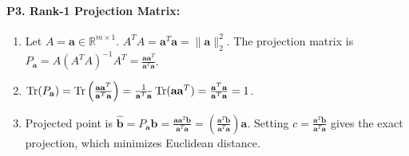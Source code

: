 \paragraph{P3. Rank-1 Projection Matrix:}
\begin{enumerate}[label=(\alph*)]
    \item Let $A = \mathbf{a} \in \mathbb{R}^{m \times 1}$. $A^T A = \mathbf{a}^T \mathbf{a} = \|\mathbf{a}\|_2^2$.
    The projection matrix is $P_{\mathbf{a}} = A(A^T A)^{-1}A^T = \frac{\mathbf{a}\mathbf{a}^T}{\mathbf{a}^T \mathbf{a}}$.
    \item $\operatorname{Tr}(P_{\mathbf{a}}) = \operatorname{Tr}\left(\frac{\mathbf{a}\mathbf{a}^T}{\mathbf{a}^T \mathbf{a}}\right) = \frac{1}{\mathbf{a}^T \mathbf{a}}\operatorname{Tr}(\mathbf{a}\mathbf{a}^T) = \frac{\mathbf{a}^T \mathbf{a}}{\mathbf{a}^T \mathbf{a}} = 1$.
    \item Projected point is $\hat{\mathbf{b}} = P_{\mathbf{a}}\mathbf{b} = \frac{\mathbf{a}\mathbf{a}^T \mathbf{b}}{\mathbf{a}^T \mathbf{a}} = \left( \frac{\mathbf{a}^T \mathbf{b}}{\mathbf{a}^T \mathbf{a}} \right) \mathbf{a}$. Setting $c = \frac{\mathbf{a}^T \mathbf{b}}{\mathbf{a}^T \mathbf{a}}$ gives the exact projection, which minimizes Euclidean distance.
\end{enumerate}

